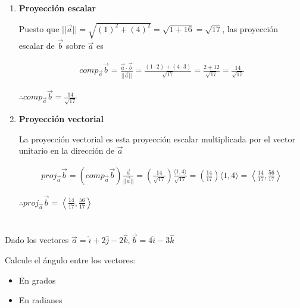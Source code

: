 \documentclass[12pt]{article}
\begin{document}
\begin{itemize}
\begin{enumerate}[format=\textbf]
  \item \textbf{Proyección escalar}

    Puesto que $||\vec{a}|| = \sqrt{(1)^2 + (4)^2} = \sqrt{1 + 16} = \sqrt{17}$, las proyección escalar de $\vec{b}$ sobre $\vec{a}$ es

    \begin{align*}
      comp_{\vec{a}}\vec{b}
      = \frac{\vec{a} \cdot \vec{b}}{||\vec{a}||}
      = \frac{(1 \cdot 2) + (4 \cdot 3)}{\sqrt{17}}
      = \frac{2 + 12}{\sqrt{17}}
      = \frac{14}{\sqrt{17}}
    \end{align*}

    $\therefore comp_{\vec{a}}\vec{b} = \frac{14}{\sqrt{17}}$

  \item \textbf{Proyección vectorial}

    La proyección vectorial es esta proyección escalar multiplicada por el vector unitario en la dirección de $\vec{a}$

    \begin{align*}
      proj_{\vec{a}}\vec{b}
      = \left( comp_{\vec{a}}\vec{b} \right) \frac{\vec{a}}{||\vec{a}||}
      = \left( \frac{14}{\sqrt{17}} \right) \frac{\langle 1, 4 \rangle}{\sqrt{17}}
      = \left( \frac{14}{17} \right) \langle 1, 4 \rangle
      = \left\langle \frac{14}{17}, \frac{56}{17} \right\rangle
    \end{align*}

    $\therefore proj_{\vec{a}}\vec{b} = \left\langle  \frac{14}{17}, \frac{56}{17} \right\rangle$
    
  \end{enumerate}
  
\end{itemize}

\section{}

Dado los vectores $\vec{a} = \hat{i} + 2\hat{j}-2\hat{k}, \vec{b} = 4\hat{i} -3\hat{k}$

Calcule el ángulo entre los vectores:

\begin{itemize}

\item En grados

\item En radianes

\end{itemize}
\end{document}
